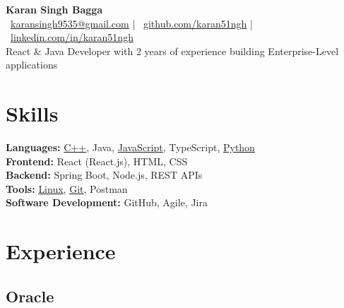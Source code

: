\documentclass[a4paper,8pt]{article}
\newcommand{\linuxGitHub}{\href{https://github.com/karan51ngh/karan51ngh}{Linux}}
\newcommand{\gitGitHub}{\href{https://github.com/karan51ngh/gitCheatSheet}{Git}}
\newcommand{\jsGitHub}{\href{https://github.com/karan51ngh?tab=repositories&q=&type=&language=javascript}{JavaScript}}
\newcommand{\cppGitHub}{\href{https://github.com/karan51ngh/topicWiseQuestions}{C++}}
\newcommand{\pythonGitHub}{\href{https://github.com/karan51ngh?tab=repositories&q=&type=&language=python}{Python}}
\begin{document}
\begin{center}
  {\LARGE \textbf{Karan Singh Bagga}} \\
  \faEnvelope\ \href{mailto:karansingh9535@gmail.com}{karansingh9535@gmail.com} \quad | \quad
  \faGithub\ \href{https://github.com/karan51ngh}{github.com/karan51ngh} \quad | \quad
  \faLinkedin\ \href{https://linkedin.com/in/karan51ngh}{linkedin.com/in/karan51ngh} \\
  \vspace{0.2em}
  React \& Java Developer with 2 years of experience building Enterprise-Level applications
\end{center}


\section*{\faTools\hspace{0.5em}Skills}
\textbf{Languages:} \cppGitHub, {Java}, \jsGitHub, {TypeScript}, \pythonGitHub \\
\textbf{Frontend:} React (React.js), HTML, CSS \\
\textbf{Backend:} Spring Boot, Node.js, REST APIs \\
\textbf{Tools:} \linuxGitHub, \gitGitHub, Postman \\
\textbf{Software Development:} GitHub, Agile, Jira

\section*{\faBriefcase\hspace{0.5em}Experience}
\subsection*{Oracle }
\end{document}
